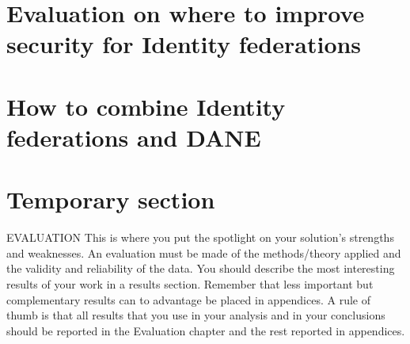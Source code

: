 \section{Evaluation on where to improve security for Identity federations}
\section{How to combine Identity federations and DANE}
\section{Temporary section}
EVALUATION This is where you put the spotlight on your solution's strengths and
weaknesses. An evaluation must be made of the methods/theory applied and the validity
and reliability of the data. You should describe the most interesting results of your work in a
results section. Remember that less important but complementary results can to advantage
be placed in appendices. A rule of thumb is that all results that you use in your analysis and
in your conclusions should be reported in the Evaluation chapter and the rest reported in
appendices.

